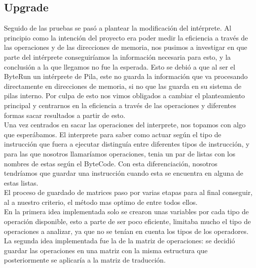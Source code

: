 \subsection{Upgrade}
Seguido de las pruebas se pasó a plantear la modificación del intérprete. Al principio como la intención del proyecto era poder medir la eficiencia a través de las operaciones y de las direcciones de memoria, nos pusimos a investigar en que parte del intérprete conseguiríamos la información necesaria para esto, y la conclusión a la que llegamos no fue la esperada. Esto se debió a que al ser el ByteRun un intérprete de Pila, este no guarda la información que va procesando directamente en direcciones de memoria, si no que las guarda en su sistema de pilas interno. Por culpa de esto nos vimos obligados a cambiar el planteamiento principal y centrarnos en la eficiencia a través de las operaciones y diferentes formas sacar resultados a partir de esto.\\

Una vez centrados en sacar las operaciones del interprete, nos topamos con algo que esperábamos. El interprete para saber como actuar según el tipo de instrucción que fuera a ejecutar distinguía entre diferentes tipos de instrucción, y para las que nosotros llamaríamos operaciones, tenia un par de listas con los nombres de estas según el ByteCode. Con esta diferenciación, nosotros tendríamos que guardar una instrucción cuando esta se encuentra en alguna de estas listas. \\

El proceso de guardado de matrices paso por varias etapas para al final conseguir, al a nuestro criterio, el método mas optimo de entre todos ellos.\\

En la primera idea implementada solo se crearon unas variables por cada tipo de operación disponible, esto a parte de ser poco eficiente, limitaba mucho el tipo de operaciones a analizar, ya que no se tenían en cuenta los tipos de los operadores.\\

La segunda idea implementada fue la de la  matriz de operaciones: se decidió guardar las operaciones en una matriz con la misma estructura que posteriormente se aplicaría a la matriz de traducción.\\

